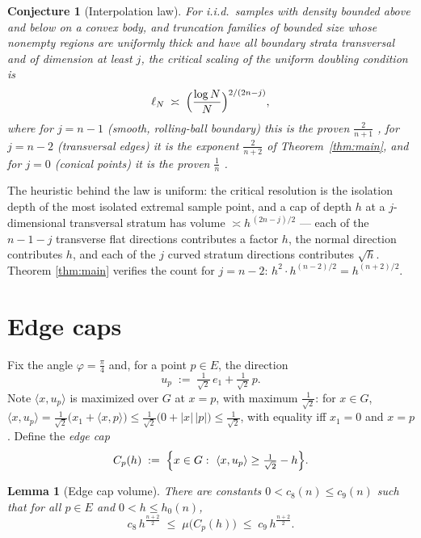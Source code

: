 \documentclass[11pt]{article}
\newtheorem{lemma}[theorem]{Lemma}
\newtheorem{conjecture}[theorem]{Conjecture}
\begin{document}
\begin{conjecture}[Interpolation law]\label{conj:law}
For i.i.d.\ samples with density bounded above and below on a convex body, and
truncation families of bounded size whose nonempty regions are uniformly thick
and have all boundary strata transversal and of dimension at least $j$, the
critical scaling of the uniform doubling condition is
\[
\ell_N\;\asymp\;\Bigl(\frac{\log N}{N}\Bigr)^{2/(2n-j)} ,
\]
where for $j=n-1$ (smooth, rolling-ball boundary) this is the proven
$\frac{2}{n+1}$ \cite{companion4}, for $j=n-2$ (transversal edges) it is the
exponent $\frac{2}{n+2}$ of Theorem~\ref{thm:main}, and for $j=0$ (conical
points) it is the proven $\frac1n$ \cite{companion3,companion5}.
\end{conjecture}

The heuristic behind the law is uniform: the critical resolution is the
isolation depth of the most isolated extremal sample point, and a cap of depth
$h$ at a $j$-dimensional transversal stratum has volume
$\asymp h^{\,(2n-j)/2}$ --- each of the $n-1-j$ transverse flat directions
contributes a factor $h$, the normal direction contributes $h$, and each of
the $j$ curved stratum directions contributes $\sqrt h$.  Theorem
\ref{thm:main} verifies the count for $j=n-2$:
$h^{2}\cdot h^{(n-2)/2}=h^{(n+2)/2}$.

\section{Edge caps}\label{sec:caps}

Fix the angle $\varphi=\frac\pi4$ and, for a point $p\in E$, the direction
\[
u_p\;:=\;\tfrac1{\sqrt2}\,e_1+\tfrac1{\sqrt2}\,p .
\]
Note $\langle x,u_p\rangle$ is maximized over $G$ at $x=p$, with maximum
$\tfrac1{\sqrt2}$: for $x\in G$,
$\langle x,u_p\rangle=\tfrac1{\sqrt2}\bigl(x_1+\langle x,p\rangle\bigr)
\le\tfrac1{\sqrt2}\bigl(0+|x|\,|p|\bigr)\le\tfrac1{\sqrt2}$,
with equality iff $x_1=0$ and $x=p$.  Define the \emph{edge cap}
\[
C_p(h)\;:=\;\Bigl\{x\in G:\ \langle x,u_p\rangle\ge\tfrac1{\sqrt2}-h\Bigr\} .
\]

\begin{lemma}[Edge cap volume]\label{lem:cap}
There are constants $0<c_8(n)\le c_9(n)$ such that for all $p\in E$ and
$0<h\le h_0(n)$,
\[
c_8\,h^{\frac{n+2}2}\;\le\;\mu\bigl(C_p(h)\bigr)\;\le\;c_9\,h^{\frac{n+2}2}.
\]
\end{lemma}
\end{document}
